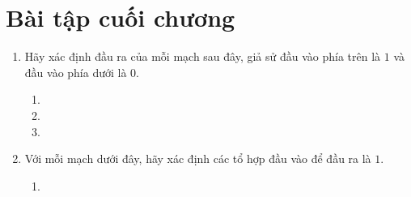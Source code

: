 
\section{Bài tập cuối chương}
\begin{multicols}{2}
  \begin{enumerate}

  \item Hãy xác định đầu ra của mỗi mạch sau đây, giả sử đầu vào phía trên là $1$ và đầu
    vào phía dưới là $0$.
    \begin{enumerate}
    \item {}

    \item {}

    \item {}
    \end{enumerate}
  \item Với mỗi mạch dưới đây, hãy xác định các tổ hợp đầu vào để đầu ra là $1$.
    \begin{enumerate}
    \item {}


\end{enumerate}
\end{enumerate}
\end{multicols}
